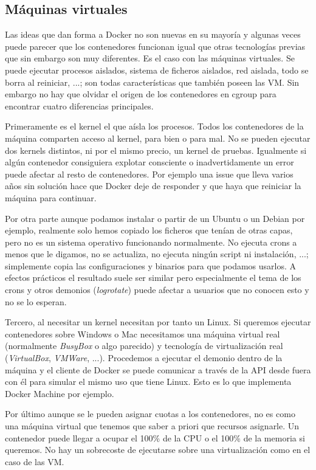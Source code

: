 \subsection{Máquinas virtuales}
\label{subsec:docker-compare-vm}

Las ideas que dan forma a Docker no son nuevas en su mayoría y algunas veces puede parecer que los contenedores funcionan igual que otras tecnologías previas que sin embargo son muy diferentes. Es el caso con las máquinas virtuales. Se puede ejecutar procesos aislados, sistema de ficheros aislados, red aislada, todo se borra al reiniciar, ...; son todas características que también poseen las VM. Sin embargo no hay que olvidar el origen de los contenedores en cgroup para encontrar cuatro diferencias principales.

Primeramente es el kernel el que aísla los procesos. Todos los contenedores de la máquina comparten acceso al kernel, para bien o para mal. No se pueden ejecutar dos kernels distintos, ni por el mismo precio, un kernel de pruebas. Igualmente si algún contenedor consiguiera explotar consciente o inadvertidamente un error puede afectar al resto de contenedores. Por ejemplo una issue que lleva varios años sin solución\cite{tankywoo2014} hace que Docker deje de responder y que haya que reiniciar la máquina para continuar.

Por otra parte aunque podamos instalar o partir de un Ubuntu o un Debian por ejemplo, realmente solo hemos copiado los ficheros que tenían de otras capas, pero no es un sistema operativo funcionando normalmente. No ejecuta crons a menos que le digamos, no se actualiza, no ejecuta ningún script ni instalación, ...; simplemente copia las configuraciones y binarios para que podamos usarlos. A efectos prácticos el resultado suele ser similar pero especialmente el tema de los crons y otros demonios (\emph{logrotate}) puede afectar a usuarios que no conocen esto y no se lo esperan.

Tercero, al necesitar un kernel necesitan por tanto un Linux. Si queremos ejecutar contenedores sobre Windows o Mac necesitamos una máquina virtual real (normalmente \emph{BusyBox} o algo parecido) y tecnología de virtualización real (\emph{VirtualBox}, \emph{VMWare}, ...). Procedemos a ejecutar el demonio dentro de la máquina y el cliente de Docker se puede comunicar a través de la API desde fuera con él para simular el mismo uso que tiene Linux. Esto es lo que implementa Docker Machine\cite{dockermachine} por ejemplo.

Por último aunque se le pueden asignar cuotas a los contenedores, no es como una máquina virtual que tenemos que saber a priori que recursos asignarle. Un contenedor puede llegar a ocupar el 100\% de la CPU o el 100\% de la memoria si queremos. No hay un sobrecoste de ejecutarse sobre una virtualización como en el caso de las VM.

